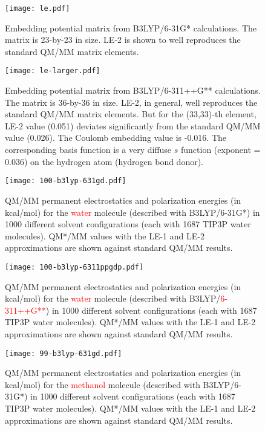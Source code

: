 \documentclass[aip,jcp,preprint,superscriptaddress,amsmath,amssymb]{revtex4-1}
\begin{document}
\begin{figure}[htp]
\caption{Embedding potential matrix from B3LYP/6-31G* calculations.   The matrix is 23-by-23 in size.    LE-2 is shown to well reproduces the standard QM/MM matrix elements.  }
\texttt{[image: le.pdf]}
\end{figure}

\begin{figure}[htp]
\caption{Embedding potential matrix from B3LYP/6-311++G** calculations.   The matrix is 36-by-36 in size.    LE-2, in general, well reproduces the standard QM/MM matrix elements.   
But for the (33,33)-th element, LE-2 value (0.051) deviates significantly from the standard QM/MM value (0.026).   The Coulomb embedding value is -0.016.   The corresponding basis function is 
a very diffuse $s$ function (exponent = 0.036) on the hydrogen atom (hydrogen bond donor). }
\texttt{[image: le-larger.pdf]}
\end{figure}

\begin{figure}
\caption{QM/MM permanent electrostatics and polarization energies (in kcal/mol) for the \textcolor{red}{water} molecule (described with B3LYP/6-31G*) in 1000 different solvent configurations (each with 1687 TIP3P water molecules).   
QM*/MM values with the LE-1 and LE-2 approximations are shown against standard QM/MM results. }
\begin{center}
\texttt{[image: 100-b3lyp-631gd.pdf]}
\end{center}
\end{figure}

\begin{figure}
\caption{QM/MM permanent electrostatics and polarization energies (in kcal/mol) for the \textcolor{red}{water} molecule (described with B3LYP/\textcolor{red}{6-311++G**}) in 1000 different solvent configurations (each with 1687 TIP3P water molecules).   
QM*/MM values with the LE-1 and LE-2 approximations are shown against standard QM/MM results. }
\begin{center}
\texttt{[image: 100-b3lyp-6311ppgdp.pdf]}
\end{center}
\end{figure}

\begin{figure}
\caption{QM/MM permanent electrostatics and polarization energies (in kcal/mol) for the \textcolor{red}{methanol} molecule (described with B3LYP/6-31G*) in 1000 different solvent configurations (each with 1687 TIP3P water molecules).   
QM*/MM values with the LE-1 and LE-2 approximations are shown against standard QM/MM results. }
\begin{center}
\texttt{[image: 99-b3lyp-631gd.pdf]}
\end{center}
\end{figure}
\end{document}
